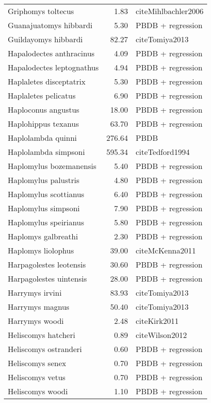 \begin{table}[ht]
\begin{tabular}{lrl}
  Griphomys toltecus & 1.83 & cite{Mihlbachler2006} \\ 
  Guanajuatomys hibbardi & 5.30 & PBDB + regression \\ 
  Guildayomys hibbardi & 82.27 & cite{Tomiya2013} \\ 
  Hapalodectes anthracinus & 4.09 & PBDB + regression \\ 
  Hapalodectes leptognathus & 4.94 & PBDB + regression \\ 
  Haplaletes disceptatrix & 5.30 & PBDB + regression \\ 
  Haplaletes pelicatus & 6.90 & PBDB + regression \\ 
  Haploconus angustus & 18.00 & PBDB + regression \\ 
  Haplohippus texanus & 63.70 & PBDB + regression \\ 
  Haplolambda quinni & 276.64 & PBDB \\ 
  Haplolambda simpsoni & 595.34 & cite{Tedford1994} \\ 
  Haplomylus bozemanensis & 5.40 & PBDB + regression \\ 
  Haplomylus palustris & 4.80 & PBDB + regression \\ 
  Haplomylus scottianus & 6.40 & PBDB + regression \\ 
  Haplomylus simpsoni & 7.90 & PBDB + regression \\ 
  Haplomylus speirianus & 5.80 & PBDB + regression \\ 
  Haplomys galbreathi & 2.30 & PBDB + regression \\ 
  Haplomys liolophus & 39.00 & cite{McKenna2011} \\ 
  Harpagolestes leotensis & 30.60 & PBDB + regression \\ 
  Harpagolestes uintensis & 28.00 & PBDB + regression \\ 
  Harrymys irvini & 83.93 & cite{Tomiya2013} \\ 
  Harrymys magnus & 50.40 & cite{Tomiya2013} \\ 
  Harrymys woodi & 2.48 & cite{Kirk2011} \\ 
  Heliscomys hatcheri & 0.89 & cite{Wilson2012} \\ 
  Heliscomys ostranderi & 0.60 & PBDB + regression \\ 
  Heliscomys senex & 0.70 & PBDB + regression \\ 
  Heliscomys vetus & 0.70 & PBDB + regression \\ 
  Heliscomys woodi & 1.10 & PBDB + regression \\ 

\end{tabular}
\end{table}
